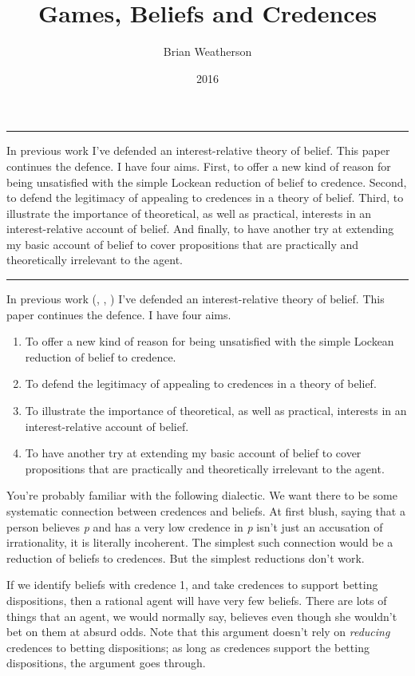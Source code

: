 \documentclass[
  10pt,
  letterpaper,
  DIV=11,
  numbers=noendperiod,
  twoside]{scrartcl}
\title{Games, Beliefs and Credences}
\author{Brian Weatherson}
\date{2016}
\providecommand{\tightlist}{%
  \setlength{\itemsep}{0pt}\setlength{\parskip}{0pt}}\usepackage{longtable,booktabs,array}
\renewenvironment{abstract}
 {\vspace{-1.25cm}
 \quotation\small\noindent\rule{\linewidth}{.5pt}\par\smallskip
 \noindent }
 {\par\noindent\rule{\linewidth}{.5pt}\endquotation}
\begin{document}
\maketitle
\begin{abstract}
In previous work I've defended an interest-relative theory of belief.
This paper continues the defence. I have four aims. First, to offer a
new kind of reason for being unsatisfied with the simple Lockean
reduction of belief to credence. Second, to defend the legitimacy of
appealing to credences in a theory of belief. Third, to illustrate the
importance of theoretical, as well as practical, interests in an
interest-relative account of belief. And finally, to have another try at
extending my basic account of belief to cover propositions that are
practically and theoretically irrelevant to the agent.
\end{abstract}


In previous work (,
,
) I've defended an
interest-relative theory of belief. This paper continues the defence. I
have four aims.

\begin{enumerate}
\def\labelenumi{\arabic{enumi}.}
\tightlist
\item
  To offer a new kind of reason for being unsatisfied with the simple
  Lockean reduction of belief to credence.
\item
  To defend the legitimacy of appealing to credences in a theory of
  belief.
\item
  To illustrate the importance of theoretical, as well as practical,
  interests in an interest-relative account of belief.
\item
  To have another try at extending my basic account of belief to cover
  propositions that are practically and theoretically irrelevant to the
  agent.
\end{enumerate}

You're probably familiar with the following dialectic. We want there to
be some systematic connection between credences and beliefs. At first
blush, saying that a person believes \emph{p} and has a very low
credence in \emph{p} isn't just an accusation of irrationality, it is
literally incoherent. The simplest such connection would be a reduction
of beliefs to credences. But the simplest reductions don't work.

If we identify beliefs with credence 1, and take credences to support
betting dispositions, then a rational agent will have very few beliefs.
There are lots of things that an agent, we would normally say, believes
even though she wouldn't bet on them at absurd odds. Note that this
argument doesn't rely on \emph{reducing} credences to betting
dispositions; as long as credences support the betting dispositions, the
argument goes through.
\end{document}
